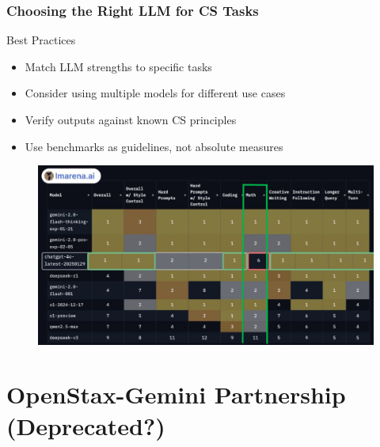 \documentclass{beamer}
\begin{document}
\begin{frame}
\frametitle{Choosing the Right LLM for CS Tasks}

\begin{block}{Best Practices}
\begin{itemize}
\item Match LLM strengths to specific tasks
\item Consider using multiple models for different use cases
\item Verify outputs against known CS principles
\item Use benchmarks as guidelines, not absolute measures
\end{itemize}
\end{block}
\begin{figure}
    \centering
    \includegraphics[width=1\linewidth]{cs12-ai-model-benchmarks-lmarena.png}
\end{figure}
\end{frame}

\section{OpenStax-Gemini Partnership (Deprecated?)}
\frame{\sectionpage}
\end{document}
